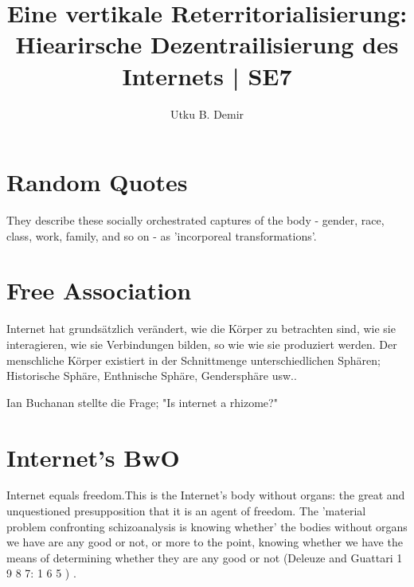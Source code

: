 

\title{Eine vertikale Reterritorialisierung: Hiearirsche Dezentrailisierung des
Internets | SE7}
\author{Utku B. Demir}


\maketitle
\tableofcontents
\newpage

\section{Random Quotes}

They describe these socially orchestrated captures of the body - gender, race, class, work, family, and so on - as 'incorporeal transformations'. \parencite[143]{mackenzie2021}

\section{Free Association}
Internet hat grundsätzlich verändert, wie die Körper zu betrachten sind, wie sie interagieren, wie sie Verbindungen bilden, so wie wie sie produziert werden. Der menschliche Körper existiert in der Schnittmenge unterschiedlichen Sphären; Historische Sphäre, Enthnische Sphäre, Gendersphäre usw..

Ian Buchanan \parencite{actualvirtualjournal2014} stellte die Frage; "Is
internet a rhizome?" 

\section{Internet's BwO}
Internet equals freedom.This is the Internet's body without organs: the great and unquestioned presupposition that it is an agent of freedom. The 'material problem confronting schizoanalysis is knowing whether' the bodies without organs we have are any good or not, or more to the point, knowing whether we have the means of determining whether they are any good or not (Deleuze and Guattari 1 9 8 7: 1 6 5 ) \parencite[148]{poster2010}.



\printbibliography


